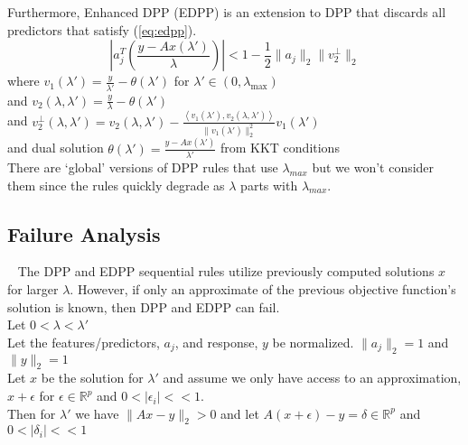 \documentclass{article}
\begin{document}
Furthermore, Enhanced DPP (EDPP) \cite{ddp} is an extension to DPP that discards all predictors that satisfy (\ref{eq:edpp}).\\

\begin{equation} \label{eq:edpp}
\left|a_j^T \left(\frac{y - Ax(\lambda')}{\lambda}\right)\right| < 1 - \frac 12 \|a_j\|_2 \|v_2^{\perp}\|_2
\end{equation}
where $v_1(\lambda') = \frac{y}{\lambda'} - \theta(\lambda')$ for $\lambda' \in (0, \lambda_{\max})$\\
and $v_2(\lambda,\lambda') = \frac{y}{\lambda} - \theta(\lambda')$\\
and $v_2^{\perp}(\lambda,\lambda') = v_2(\lambda,\lambda') - \frac{\left<v_1(\lambda'),v_2(\lambda,\lambda')\right>}{\|v_1(\lambda')\|^2_2} v_1(\lambda')$\\
and dual solution $\theta(\lambda') = \frac{y-Ax(\lambda')}{\lambda'} $ from KKT conditions \\

There are `global' versions of DPP rules that use $\lambda_{max}$ but we won't consider them since the rules quickly degrade as $\lambda$ parts with $\lambda_{max}$.



\subsection*{Failure Analysis}

\qquad ~ The DPP and EDPP sequential rules utilize previously computed solutions $x$ for larger $\lambda$. However, if only an approximate of the previous objective function's solution is known, then DPP and EDPP can fail.\\

Let $0<\lambda<\lambda'$ \\
Let the features/predictors, $a_j$, and response, $y$ be normalized. $\|a_j\|_2=1$ and $\|y\|_2=1$\\
Let $x$ be the solution for $\lambda'$ and assume we only have access to an approximation, $x+\epsilon$ for $\epsilon\in \mathbb{R}^p$ and $0<|\epsilon_i|<<1$. \\
Then for $\lambda'$ we have $\|Ax-y\|_2>0$ and let $A(x+\epsilon)-y = \delta \in \mathbb{R}^p$ and $0<|\delta_i|<<1$
\end{document}
